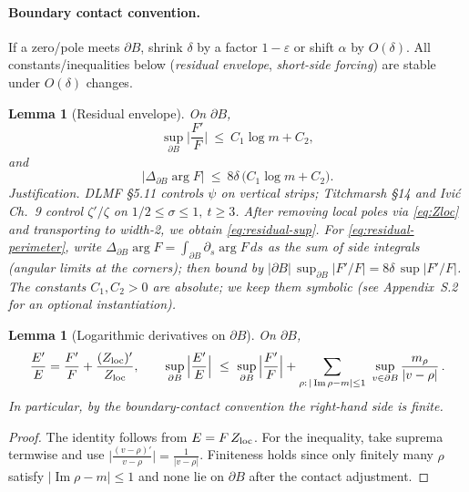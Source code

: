\documentclass[11pt]{article}
\numberwithin{equation}{section}
\newtheorem{lemma}[theorem]{Lemma}
\theoremstyle{remark}
\DeclareMathOperator{\Imag}{Im}
\begin{document}
\paragraph{Boundary contact convention.}
If a zero/pole meets $\partial B$, shrink $\delta$ by a factor $1-\varepsilon$ or shift $\alpha$ by $O(\delta)$. All constants/inequalities below (\emph{residual envelope}, \emph{short-side forcing}) are stable under $O(\delta)$ changes. %

\begin{lemma}[Residual envelope]\label{lem:residual}
On $\partial B$,
\begin{equation}\label{eq:residual-sup}
\sup_{\partial B}\Big|\frac{F'}{F}\Big|\ \le\ C_1\log m + C_2,
\end{equation}
and
\begin{equation}\label{eq:residual-perimeter}
\big|\Delta_{\partial B}\arg F\big|\ \le\ 8\delta\,\big(C_1\log m+C_2\big).
\end{equation}
\emph{Justification.} DLMF §5.11 controls $\psi$ on vertical strips; Titchmarsh §14 and Ivi\'c Ch.~9 control $\zeta'/\zeta$ on $1/2\le\sigma\le 1,\ t\ge 3$. After removing local poles via \eqref{eq:Zloc} and transporting to width-2, we obtain \eqref{eq:residual-sup}. For \eqref{eq:residual-perimeter}, write $\Delta_{\partial B}\arg F=\int_{\partial B}\partial_s\arg F\,ds$ as the sum of side integrals (angular limits at the corners); then bound by $|\partial B|\,\sup_{\partial B}|F'/F|=8\delta\,\sup|F'/F|$. The constants $C_1,C_2>0$ are absolute; we keep them symbolic (see Appendix~S.2 for an optional instantiation). %
\end{lemma}

\begin{lemma}[Logarithmic derivatives on $\partial B$]\label{lem:bridge-logs}
On $\partial B$,
\[
\frac{E'}{E}=\frac{F'}{F}+\frac{(Z_{\rm loc})'}{Z_{\rm loc}},\qquad
\sup_{\partial B}\Big|\frac{E'}{E}\Big|
\ \le\ \sup_{\partial B}\Big|\frac{F'}{F}\Big|+\sum_{\rho:\,|\Imag\rho-m|\le 1}\ \sup_{v\in\partial B}\frac{m_\rho}{|v-\rho|}\,.
\]
In particular, by the boundary-contact convention the right-hand side is finite.
\end{lemma}
\begin{proof}
The identity follows from $E=F\,Z_{\rm loc}$. For the inequality, take suprema termwise and use $\big|\frac{(v-\rho)'}{v-\rho}\big|=\frac{1}{|v-\rho|}$. Finiteness holds since only finitely many $\rho$ satisfy $|\Imag\rho-m|\le 1$ and none lie on $\partial B$ after the contact adjustment.
\end{proof}
\end{document}
